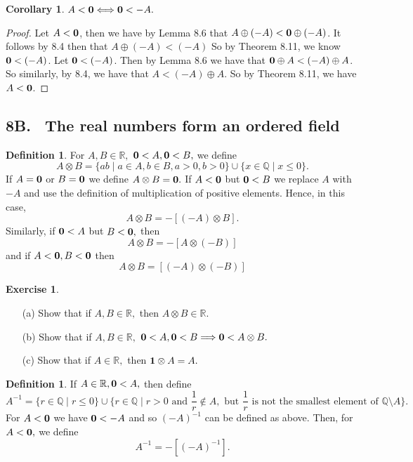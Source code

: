 \documentclass[12pt]{article}
\newcommand{\bbQ}{\mathbb{Q}}
\newcommand{\bbR}{\mathbb{R}}
\renewcommand{\_}[1]{\underline{ #1 }}
\newtheorem{corollary}[theorem]{Corollary}
\theoremstyle{definition}
\newtheorem{definition}[theorem]{Definition}
\newtheorem{exercise}[theorem]{Exercise}
\numberwithin{equation}{subsection}
\begin{document}
\begin{corollary}
$A<{\bf 0}\Longleftrightarrow {\bf 0}<-A.$
\end{corollary}
\begin{proof}
Let $A<{\bf 0}$, then we have by Lemma 8.6 that $A \oplus (-A) < {\bf 0} \oplus (-A)$. It follows by 8.4 then that $A \oplus (-A) < (-A)$ So by Theorem 8.11, we know ${\bf 0} < (-A)$. \newline
Let ${\bf 0} < (-A)$. Then by Lemma 8.6 we have that ${\bf 0} \oplus A < (-A) \oplus A$. So similarly, by 8.4, we have that $A < (-A) \oplus A$. So by Theorem 8.11, we have $A <{\bf 0}$. 
\end{proof}

\subsection*{8B. \ The real numbers form an ordered field}

\begin{definition}
For $A,B\in\bbR,$ ${\bf 0}<A, {\bf 0}<B,$ we define
$$A\otimes B =\{ab\mid a\in A,b\in B, a>0,b>0\}\cup\{x\in\bbQ\mid x\leq 0\}.$$
If $A={\bf 0}$ or $B={\bf 0}$ we define $A\otimes B={\bf 0}.$
If $A<{\bf 0}$ but ${\bf 0}<B$  we replace $A$ with $-A$ and use the definition of multiplication
of positive elements. Hence, in this case,
$$A\otimes B=-[(-A)\otimes B].$$
Similarly, if ${\bf 0}<A$ but $B<{\bf 0},$ then 
$$A\otimes B=-[A\otimes (-B)]$$
and 
if $A<{\bf 0}, B<{\bf 0}$ then
$$A\otimes B=[(-A)\otimes (-B)]$$
\end{definition}

\begin{exercise}
\begin{itemize}
\item[(a)] Show that if $A,B\in \bbR,$ then $A\otimes B\in\bbR.$
\item[(b)] Show that if $A,B\in\bbR,$ ${\bf 0}<A,{\bf 0}<B\Longrightarrow {\bf 0}<A\otimes B.$ 
\item[(c)] Show that if $A\in\bbR,$ then ${\bf 1}\otimes A=A.$
\end{itemize}
\end{exercise}

\begin{definition}
If $A\in\bbR, {\bf 0}<A,$ then define
$$A^{-1}=\{r\in\bbQ\mid r\leq 0\}\cup\{r\in\bbQ\mid r>0\text{ and }\frac{1}{r}\not\in A, \text{ but } \frac{1}{r} \text{ is not the smallest element of }\bbQ\setminus A\}.$$
For $A<{\bf 0}$ we have ${\bf 0}<-A$ and so $(-A)^{-1}$ can be defined as above. Then, for $A<{\bf 0},$ we define
$$A^{-1}=-[(-A)^{-1}].$$
\end{definition}
\end{document}
